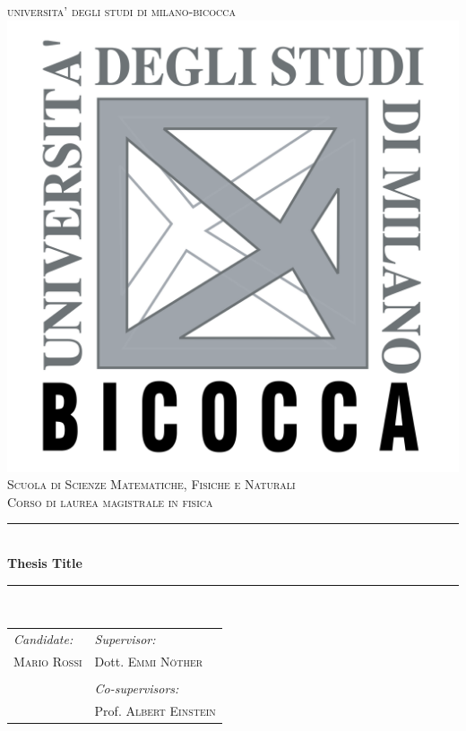 \documentclass[a4]{article}
\begin{document}
\begin{titlepage}

\newcommand{\HRule}{\rule{\linewidth}{0.5mm}} %

\center %
 
{ 
\textsc{\LARGE universita' degli studi di milano-bicocca}\\[1cm] %
}
\includegraphics[width = .25\textwidth]{logo_unimib.png}\\[1cm] %
\textsc{\Large Scuola di Scienze Matematiche, Fisiche e Naturali }\\[0.25cm] %
\textsc{\large Corso di laurea magistrale in fisica}\\[0.75cm] %


\HRule \\[0.4cm]
{ 
{\huge \bfseries Thesis Title }\\[0.4cm] %
}
\HRule \\[1.5cm]
 
\begin{table}[htb!]
\centering
\begin{tabularx}{\textwidth}{X X}
\emph{Candidate:} & \emph{Supervisor:} \\
\textsc{Mario Rossi} & Dott. \textsc{Emmi N\"other}  \\
& \\
& \emph{Co-supervisors:} \\
& Prof. \textsc{Albert Einstein} \\
\end{tabularx}
\end{table}


\end{titlepage}
\end{document}
